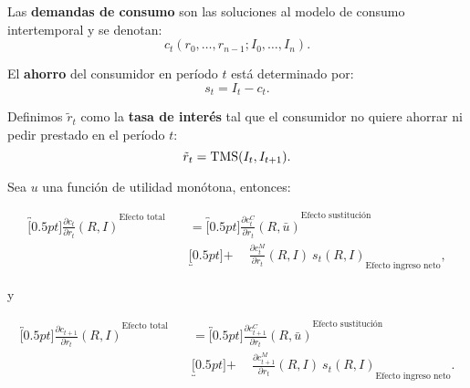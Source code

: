 \documentclass[8pt,a4paper]{extarticle}
\begin{document}
\begin{multicols}{3}
\begin{boxdef}
	Las \textbf{demandas de consumo} son las soluciones al modelo de consumo intertemporal y se denotan:
	\[
		c_t(r_0, \ldots, r_{n-1}; I_0, \ldots, I_n)
	.\] 
\end{boxdef}

\begin{boxdef}[Ahorro]
	El \textbf{ahorro} del consumidor en período $t$ está determinado por:
	\[
		s_t = I_t - c_t
	.\] 
\end{boxdef}

\begin{boxdef}
	Definimos $\tilde{r}_t$ como la \textbf{tasa de interés} tal que el consumidor no quiere ahorrar ni pedir prestado en el período $t$:
	\[
		\tilde{r}_t = \text{\normalfont TMS} (I_t, I_{t+1})
	.\] 
\end{boxdef}

\sectionbreak

\begin{boxtheo}
	Sea $u$ una función de utilidad monótona, entonces:
	
	\begin{equation*}
	\begin{aligned}
		\overbracket[0.5pt]{\frac{\partial c_t}{\partial r_t} (R, I)}^{\text{Efecto total}} \quad &= \overbracket[0.5pt]{\frac{\partial c_t^C}{\partial r_t} (R, \bar{u})}^{\text{Efecto sustitución}} \\
																						   & \underbracket[0.5pt]{ + \quad\ \frac{\partial c_t^M}{\partial r_t} (R, I)\ s_t (R, I)}_{\text{Efecto ingreso neto}},
	\end{aligned}
	\end{equation*}	

	y

	\begin{equation*}
	\begin{aligned}
		\overbracket[0.5pt]{\frac{\partial c_{t+1}}{\partial r_t} (R, I)}^{\text{Efecto total}} \quad &= \overbracket[0.5pt]{\frac{\partial c_{t+1}^C}{\partial r_t} (R, \bar{u})}^{\text{Efecto sustitución}} \\
																					   & \underbracket[0.5pt]{ + \quad\ \frac{\partial c_{t+1}^M}{\partial r_t} (R, I)\ s_t (R, I)}_{\text{Efecto ingreso neto}}.
	\end{aligned}
	\end{equation*}	
	
\end{boxtheo}


\end{multicols}
\end{document}

